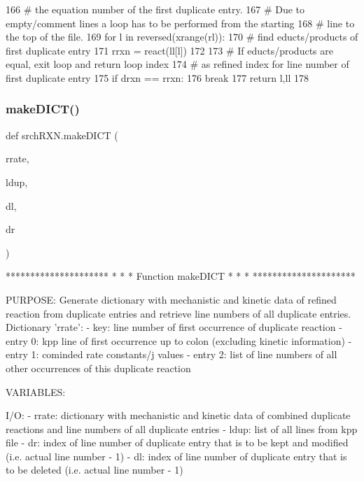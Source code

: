 \begin{DoxyCode}
166 \textcolor{comment}{# the equation number of the first duplicate entry.}
167 \textcolor{comment}{# Due to empty/comment lines a loop has to be performed from the starting}
168 \textcolor{comment}{# line to the top of the file.}
169         \textcolor{keywordflow}{for} l \textcolor{keywordflow}{in} reversed(xrange(rl)):
170 \textcolor{comment}{# find educts/products of first duplicate entry}
171             rrxn = react(ll[l])
172 
173 \textcolor{comment}{# If educts/products are equal, exit loop and return loop index}
174 \textcolor{comment}{# as refined index for line number of first duplicate entry}
175             \textcolor{keywordflow}{if} drxn == rrxn:
176                 \textcolor{keywordflow}{break}
177     \textcolor{keywordflow}{return} l,ll
178 
\end{DoxyCode}
\mbox{\label{namespacesrchRXN_a2d5632f8f982579d62c5b03a0d172de6}} 
\subsubsection{\texorpdfstring{make\+D\+I\+C\+T()}{makeDICT()}}
{\footnotesize\ttfamily def srch\+R\+X\+N.\+make\+D\+I\+CT (\begin{DoxyParamCaption}\item[{}]{rrate,  }\item[{}]{ldup,  }\item[{}]{dl,  }\item[{}]{dr }\end{DoxyParamCaption})}

\begin{DoxyVerb}*********************
*                   *
* Function makeDICT *
*                   *
*********************

PURPOSE:
    Generate dictionary with mechanistic and kinetic data of refined
    reaction from duplicate entries and retrieve line numbers of all
    duplicate entries.
    Dictionary 'rrate':
    - key:      line number of first occurrence of duplicate reaction
    - entry 0:  kpp line of first occurrence up to colon
                (excluding kinetic information)
    - entry 1:  cominded rate constants/j values
    - entry 2:  list of line numbers of all other occurrences of
                this duplicate reaction


VARIABLES:

I/O:
    - rrate:    dictionary with mechanistic and kinetic data of
                combined duplicate reactions and line numbers of
                all duplicate entries
    - ldup:     list of all lines from kpp file
    - dr:       index of line number of duplicate entry that is
                to be kept and modified (i.e. actual line number - 1)
    - dl:       index of line number of duplicate entry that is
                to be deleted (i.e. actual line number - 1)
\end{DoxyVerb}
 
